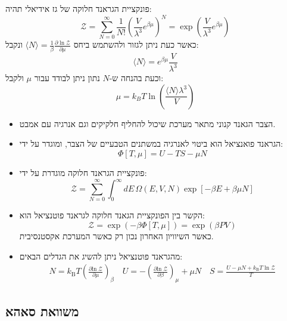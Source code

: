 \documentclass{tstextbook}
\begin{document}
\begin{example}
פונקציית הגראנד חלוקה של גז אידיאלי תהיה:
$${\mathcal{Z}}=\sum_{N=0}^{\infty}{\frac{1}{N!}}\left({\frac{V}{\lambda^{3}}}e^{\beta\mu}\right)^{N}=\exp\left( \frac{V}{\lambda^{3}}e^{ \beta \mu }\right)$$
כאשר כעת ניתן לגזור ולהשתמש ביחס \(\langle N\rangle=\frac{1}{\beta}\frac{\partial\ln{\mathcal{Z}}}{\partial\mu}\) ונקבל:
$$\langle N\rangle=e^{\beta\mu}\frac{V}{\lambda^{3}}$$
וכעת בהנחה ש-\(N\) נתון ניתן לבודד עבור \(\mu\) ולקבל:
$$\mu=k_{B}T\ln\left(\frac{\langle N\rangle\lambda^{3}}{V}\right)$$

\end{example}
\begin{summary}
  \begin{itemize}
    \item הצבר הגאנד קנוני מתאר מערכת שיכול להחליף חלקיקים וגם אנרגיה עם אמבט.
    \item הגראנד פואנציאל הוא ביטוי לאנרגיה במשתנים הטבעיים של הצבר, ומוגדר על ידי:
$$\Phi[T,\mu]=U-T S-\mu N$$
    \item פונקציית הגראנד חלוקה מוגדרת על ידי:
$${\mathcal{Z}}=\sum_{N=0}^{\infty}\int_{0}^{\infty}d E\,\Omega(E,V,N)\exp\left[-\beta E+\beta\mu N\right]$$
    \item הקשר בין הפונקציית הגאנד חלוקה לגראנד פוטנציאל הוא:
$${\mathcal{Z}}=\exp(-\beta \Phi[T,\mu])=\exp(\beta P V)$$
כאשר השיוויון האחרון נכון רק כאשר המערכת אקסטנסיבית.
    \item מהגראנד פוטנציאל ניתן להשיג את הגדלים הבאים:
$$\begin{gather}N=k_{\mathrm{B}}T\left({\frac{\partial\mathrm{ln}\;{\mathcal{Z}}}{\partial\mu}}\right)_{\beta}\quad U=-\left(\frac{\partial\mathrm{ln}\;\mathcal{Z}}{\partial\beta}\right)_{\mu}+\mu N\quad S={\frac{U-\mu N+k_{\mathrm{B}}T\ln{\mathcal{Z}}}{T}} 
\end{gather}$$
  \end{itemize}
\end{summary}
\subsection{משוואת סאהא}
\end{document}
